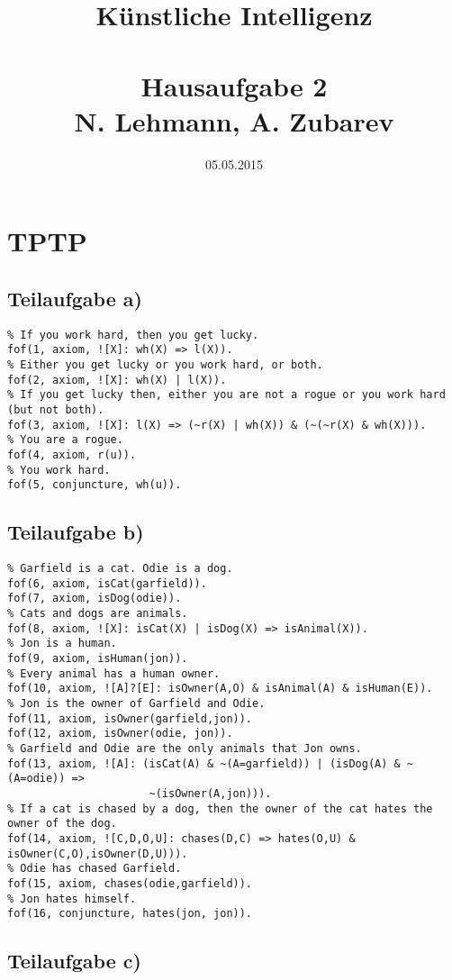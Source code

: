 \documentclass{article}
\title{Künstliche Intelligenz\\~\\Hausaufgabe 2\\ \small{N. Lehmann, A. Zubarev}}
\date{05.05.2015}
\begin{document}
\maketitle

\section{TPTP}

\subsection{Teilaufgabe a)}

\begin{verbatim}
% If you work hard, then you get lucky.
fof(1, axiom, ![X]: wh(X) => l(X)).
% Either you get lucky or you work hard, or both.
fof(2, axiom, ![X]: wh(X) | l(X)).
% If you get lucky then, either you are not a rogue or you work hard (but not both).
fof(3, axiom, ![X]: l(X) => (~r(X) | wh(X)) & (~(~r(X) & wh(X))).
% You are a rogue.
fof(4, axiom, r(u)).
% You work hard.
fof(5, conjuncture, wh(u)).
\end{verbatim}

\subsection{Teilaufgabe b)}

\begin{verbatim}
% Garfield is a cat. Odie is a dog.
fof(6, axiom, isCat(garfield)).
fof(7, axiom, isDog(odie)).
% Cats and dogs are animals.
fof(8, axiom, ![X]: isCat(X) | isDog(X) => isAnimal(X)).
% Jon is a human.
fof(9, axiom, isHuman(jon)).
% Every animal has a human owner.
fof(10, axiom, ![A]?[E]: isOwner(A,O) & isAnimal(A) & isHuman(E)).
% Jon is the owner of Garfield and Odie.
fof(11, axiom, isOwner(garfield,jon)).
fof(12, axiom, isOwner(odie, jon)).
% Garfield and Odie are the only animals that Jon owns.
fof(13, axiom, ![A]: (isCat(A) & ~(A=garfield)) | (isDog(A) & ~(A=odie)) =>
                      ~(isOwner(A,jon))).
% If a cat is chased by a dog, then the owner of the cat hates the owner of the dog.
fof(14, axiom, ![C,D,O,U]: chases(D,C) => hates(O,U) & isOwner(C,O),isOwner(D,U))).
% Odie has chased Garfield.
fof(15, axiom, chases(odie,garfield)).
% Jon hates himself.
fof(16, conjuncture, hates(jon, jon)).
\end{verbatim}

\subsection{Teilaufgabe c)}
\end{document}
